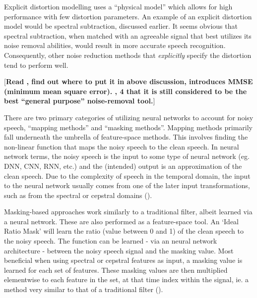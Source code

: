 \documentclass[dissertation,copyright]{uathesis}
\begin{document}

Explicit distortion modelling uses a ``physical model'' which allows for high performance with few distortion parameters. An example of an explicit distortion model would be spectral subtraction, discussed earlier.  It seems obvious that spectral subtraction, when matched with an agreeable signal that best utilizes its noise removal abilities, would result in more accurate speech recognition.  Consequently, other noise reduction methods that \textit{explicitly} specify the distortion tend to perform well.


[\textbf{Read \cite{paliwal:12}, find out where to put it in above discussion, introduces MMSE (minimum mean square error). \cite{zhang:17}, 4 that it is still considered to be the best ``general purpose'' noise-removal tool.}]


There are two primary categories of utilizing neural networks to account for noisy speech, ``mapping methods'' and ``masking methods''.  Mapping methods primarily fall underneath the umbrella of feature-space methods.  This involves finding the non-linear function that maps the noisy speech to the clean speech.  In neural network terms, the noisy speech is the input to some type of neural network (eg. DNN, CNN, RNN, etc.) and the (intended) output is an approximation of the clean speech.  Due to the complexity of speech in the temporal domain, the input to the neural network usually comes from one of the later input transformations, such as from the spectral or cepstral domains (\cite{zhang:17}).

Masking-based approaches work similarly to a traditional filter, albeit learned via a neural network. These are also performed as a feature-space tool.  An `Ideal Ratio Mask' will learn the ratio (value between 0 and 1) of the clean speech to the noisy speech.  The function can be learned - via an neural network architecture - between the noisy speech signal and the masking value.  Most beneficial when using spectral or cepstral features as input, a masking value is learned for each set of features.  These masking values are then multiplied elementwise to each feature in the set, at that time index within the signal, ie. a method very similar to that of a traditional filter (\cite{zhang:17}).
\end{document}
